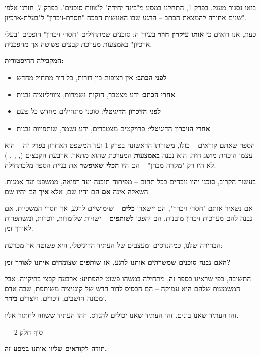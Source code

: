
בואו נסגור מעגל. בפרק \num{1}, התחלנו במסע מ"בינה יחידה" ל"צוות סוכנים". בפרק \num{7}, חזרנו אלפי שנים אחורה להמצאת הכתב – הרגע שבו האנושות הפכה "חסרת-זיכרון" ל"בעלת-ארכיון".

כעת, אנו רואים כי \textbf{אותו עיקרון חוזר} בעידן ה: סוכנים שמתחילים "חסרי זיכרון" הופכים "בעלי ארכיון" באמצעות מערכת קבצים פשוטה אך מהפכנית.

\textbf{המקבילה ההיסטורית:}
\begin{itemize}
  \item \textbf{לפני הכתב}: אין רציפות בין דורות, כל דור מתחיל מחדש
  \item \textbf{אחרי הכתב}: ידע מצטבר, חוקות נשמרות, ציוויליזציה נבנית
  \item \textbf{לפני הזיכרון הדיגיטלי}: סוכני  מתחילים מחדש כל פעם
  \item \textbf{אחרי הזיכרון הדיגיטלי}: פרויקטים מצטברים, ידע נשמר, שותפויות נבנות
\end{itemize}

הספר שאתם קוראים – כולו, משורתו הראשונה בפרק \num{1} ועד המשפט האחרון בפרק זה – הוא עצמו הוכחת מושג חיה. הוא נבנה \textbf{באמצעות} המערכת שהוא מתאר. ארבעת הקבצים (, , , ) לא היו רק "מקרה מבחן" – הם היו \textbf{הכלי שאיפשר} את בניית הספר מלכתחילה.


בעשור הקרוב, סוכני  יהיו נוכחים בכל תחום – מפיתוח תוכנה ועד רפואה, ממשפט ועד אמנות. השאלה אינה \textbf{אם} הם יהיו שם, אלא \textbf{איך} הם יהיו שם.

אם נשאיר אותם "חסרי זיכרון", הם יישארו \textbf{כלים} – שימושיים לרגע, אך חסרי המשכיות. אם נבנה להם מערכות זיכרון מובנות, הם יהפכו \textbf{לשותפים} – ישויות שלומדות, זוכרות, ומשתפרות לאורך זמן.

הבחירה שלנו, כמהנדסים ומעצבים של העתיד הדיגיטלי, היא פשוטה אך מכרעת:

\textbf{האם נבנה סוכנים שמשרתים אותנו לרגע, או שותפים שצומחים איתנו לאורך זמן?}

התשובה, כפי שראינו בספר זה, מתחילה במשהו פשוט להפתיע: ארבעה קבצי  בתיקייה. אבל המשמעות שלהם היא עמוקה – הם הבסיס לדור חדש של קוגניציה משותפת, שבה אדם ומכונה חושבים, זוכרים, ויוצרים \textbf{ביחד}.

זהו העתיד שאנו בונים. זהו העתיד שאנו יכולים להנדס. וזהו העתיד ששווה לחתור אליו.

\vspace{1em}

\begin{center}
--- סוף חלק \num{2} ---

\vspace{0.5em}

\textbf{תודה לקוראים שליוו אותנו במסע זה.}
\end{center}

\begin{center}
\end{center}
